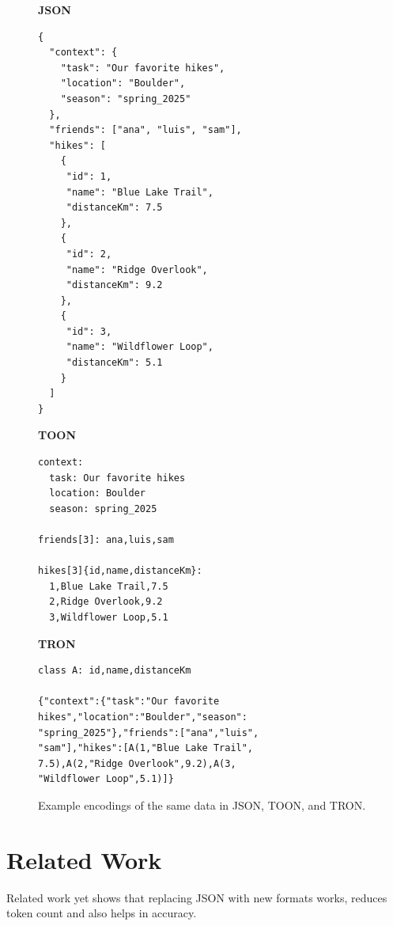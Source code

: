 \documentclass[10pt,twocolumn,letterpaper]{article}
\begin{document}
\begin{figure}[t]
\centering
\scriptsize

\begin{minipage}[t]{0.32\textwidth}
\textbf{JSON}
\vspace{2mm}

\begin{verbatim}
{
  "context": {
    "task": "Our favorite hikes",
    "location": "Boulder",
    "season": "spring_2025"
  },
  "friends": ["ana", "luis", "sam"],
  "hikes": [
    {
     "id": 1, 
     "name": "Blue Lake Trail",
     "distanceKm": 7.5
    },
    {
     "id": 2, 
     "name": "Ridge Overlook",
     "distanceKm": 9.2
    },
    {
     "id": 3, 
     "name": "Wildflower Loop",
     "distanceKm": 5.1
    }
  ]
}
\end{verbatim}
\end{minipage}
\hfill
\begin{minipage}[t]{0.32\textwidth}
\textbf{TOON}
\vspace{2mm}

\begin{verbatim}
context:
  task: Our favorite hikes
  location: Boulder
  season: spring_2025

friends[3]: ana,luis,sam

hikes[3]{id,name,distanceKm}:
  1,Blue Lake Trail,7.5
  2,Ridge Overlook,9.2
  3,Wildflower Loop,5.1
\end{verbatim}
\end{minipage}
\hfill
\begin{minipage}[t]{0.32\textwidth}
\textbf{TRON}
\vspace{2mm}

\begin{verbatim}
class A: id,name,distanceKm

{"context":{"task":"Our favorite
hikes","location":"Boulder","season":
"spring_2025"},"friends":["ana","luis",
"sam"],"hikes":[A(1,"Blue Lake Trail",
7.5),A(2,"Ridge Overlook",9.2),A(3,
"Wildflower Loop",5.1)]}
\end{verbatim}
\end{minipage}

\caption{Example encodings of the same data in JSON, TOON, and TRON.}
\label{fig:serialization_examples}

\end{figure}

\section{Related Work}
\label{sec:related_work}
Related work yet shows that replacing JSON with new formats works, reduces token count and also helps in accuracy.
\end{document}
